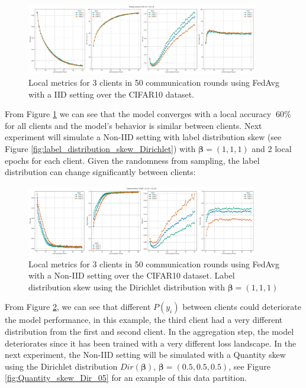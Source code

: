 \begin{figure}[H]
  \centering
  \includegraphics[width=0.9\textwidth]{figures/2-Federated_Learning/FedAvg_IID_CIFAR10_222.png}
  \caption{Local metrics for 3 clients in 50 communication rounds using FedAvg with a IID setting over the CIFAR10 dataset.}
  \label{fig:FedAvg_IID}
\end{figure}

From Figure \ref{fig:FedAvg_IID} we can see that the model converges with a local accuracy $~60\%$ for all clients and the model's behavior is similar between clients. Next experiment will simulate a Non-IID setting with label distribution skew (see Figure \ref{fig:label_distribution_skew_Dirichlet}) with $\boldsymbol{\beta} = (1,1,1)$ and 2 local epochs for each client. Given the randomness from sampling, the label distribution can change significantly between clients:

\begin{figure}[H]
  \centering
  \includegraphics[width=0.9\textwidth]{figures/2-Federated_Learning/FedAvg_Dir_1_CIFAR10_222.png}
  \caption{Local metrics for 3 clients in 50 communication rounds using FedAvg with a Non-IID setting over the CIFAR10 dataset. Label distribution skew using the Dirichlet distribution with $\boldsymbol{\beta} = (1, 1, 1)$ }
  \label{fig:FedAvg_label_Dirichlet_05}
\end{figure}

From Figure \ref{fig:FedAvg_label_Dirichlet_05}, we can see that different $P(y_i)$ between clients could deteriorate the model performance, in this example, the third client had a very different distribution from the first and second client. In the aggregation step, the model deteriorates since it has been trained with a very different loss landscape.
In the next experiment, the Non-IID setting will be simulated with a Quantity skew using the Dirichlet distribution $Dir(\boldsymbol{\beta})$, $\boldsymbol{\beta} = (0.5, 0.5, 0.5)$, see Figure \ref{fig:Quantity_skew_Dir_05} for an example of this data partition.

